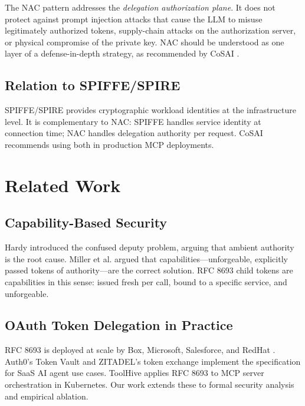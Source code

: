\documentclass[journal]{IEEEtran}
\begin{document}
The NAC pattern addresses the \textit{delegation authorization plane}. It does
not protect against prompt injection attacks that cause the LLM to misuse
legitimately authorized tokens, supply-chain attacks on the authorization server,
or physical compromise of the private key. NAC should be understood as one layer
of a defense-in-depth strategy, as recommended by CoSAI \cite{cosai_mcp}.

\subsection{Relation to SPIFFE/SPIRE}

SPIFFE/SPIRE \cite{spiffe} provides cryptographic workload identities at the
infrastructure level. It is complementary to NAC: SPIFFE handles service
identity at connection time; NAC handles delegation authority per request. CoSAI
\cite{cosai_mcp} recommends using both in production MCP deployments.


\FloatBarrier  %

\section{Related Work}
\label{sec:related}

\subsection{Capability-Based Security}

Hardy \cite{hardy1988} introduced the confused deputy problem, arguing that
ambient authority is the root cause. Miller et al. \cite{miller2003} argued that
capabilities---unforgeable, explicitly passed tokens of authority---are the
correct solution. RFC 8693 child tokens are capabilities in this sense: issued
fresh per call, bound to a specific service, and unforgeable.

\subsection{OAuth Token Delegation in Practice}

RFC 8693 \cite{rfc8693} is deployed at scale by Box, Microsoft, Salesforce, and
RedHat \cite{rfc8693_deploy}. Auth0's Token Vault \cite{auth0_token_vault} and
ZITADEL's token exchange \cite{zitadel_te} implement the specification for SaaS
AI agent use cases. ToolHive \cite{toolhive} applies RFC 8693 to MCP server
orchestration in Kubernetes. Our work extends these to formal security analysis
and empirical ablation.
\end{document}
